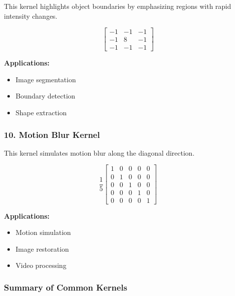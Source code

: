 \documentclass[11pt]{article}
\begin{document}
This kernel highlights object boundaries by emphasizing regions with rapid intensity changes.

\[
\begin{bmatrix}
-1 & -1 & -1\\
-1 & 8 & -1\\
-1 & -1 & -1
\end{bmatrix}
\]

\textbf{Applications:}
\begin{itemize}
\item Image segmentation
\item Boundary detection
\item Shape extraction
\end{itemize}

\subsubsection*{10. Motion Blur Kernel}

This kernel simulates motion blur along the diagonal direction.

\[
\frac{1}{5}
\begin{bmatrix}
1 & 0 & 0 & 0 & 0\\
0 & 1 & 0 & 0 & 0\\
0 & 0 & 1 & 0 & 0\\
0 & 0 & 0 & 1 & 0\\
0 & 0 & 0 & 0 & 1
\end{bmatrix}
\]

\textbf{Applications:}
\begin{itemize}
\item Motion simulation
\item Image restoration
\item Video processing
\end{itemize}

\subsubsection*{Summary of Common Kernels}
\end{document}
